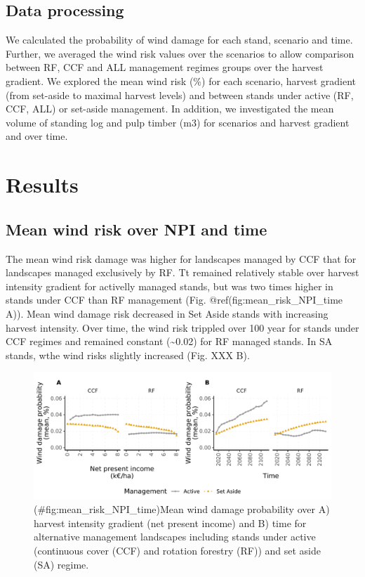 \documentclass[]{elsarticle} %
\begin{document}
\hypertarget{data-processing}{%
\subsection{Data processing}\label{data-processing}}

We calculated the probability of wind damage for each stand, scenario and time. Further, we averaged the wind risk values over the scenarios to allow comparison between RF, CCF and ALL management regimes groups over the harvest gradient. We explored the mean wind risk (\%) for each scenario, harvest gradient (from set-aside to maximal harvest levels) and between stands under active (RF, CCF, ALL) or set-aside management. In addition, we investigated the mean volume of standing log and pulp timber (m3) for scenarios and harvest gradient and over time.

\hypertarget{results}{%
\section{Results}\label{results}}

\hypertarget{mean-wind-risk-over-npi-and-time}{%
\subsection{Mean wind risk over NPI and time}\label{mean-wind-risk-over-npi-and-time}}

The mean wind risk damage was higher for landscapes managed by CCF that for landscapes managed exclusively by RF. Tt remained relatively stable over harvest intensity gradient for activelly managed stands, but was two times higher in stands under CCF than RF management (Fig. @ref(fig:mean\_risk\_NPI\_time A)). Mean wind damage risk decreased in Set Aside stands with increasing harvest intensity. Over time, the wind risk trippled over 100 year for stands under CCF regimes and remained constant (\textasciitilde0.02) for RF managed stands. In SA stands, wthe wind risks slightly increased (Fig. XXX B).

\begin{figure}
\centering
\includegraphics{test_manus4_puhti_files/figure-latex/mean_risk_NPI_time-1.pdf}
\caption{(\#fig:mean\_risk\_NPI\_time)Mean wind damage probability over A) harvest intensity gradient (net present income) and B) time for alternative management landscapes including stands under active (continuous cover (CCF) and rotation forestry (RF)) and set aside (SA) regime.}
\end{figure}
\end{document}
